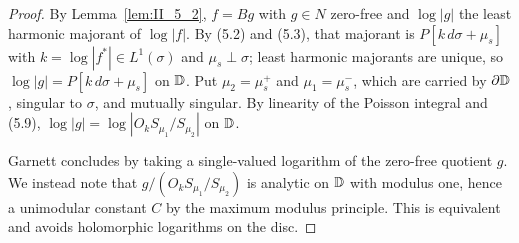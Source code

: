 \begin{proof}
  \leanok
  By Lemma~\ref{lem:II_5_2}, $f=Bg$ with $g\in N$ zero-free and $\log|g|$ the
  least harmonic majorant of $\log|f|$. By (5.2) and (5.3), that majorant is
  $P[k\,d\sigma+\mu_s]$ with $k=\log|f^*|\in L^1(\sigma)$ and
  $\mu_s\perp\sigma$; least harmonic majorants are unique, so
  $\log|g|=P[k\,d\sigma+\mu_s]$ on $\mathbb{D}$. Put $\mu_2=\mu_s^+$ and
  $\mu_1=\mu_s^-$, which are carried by $\partial\mathbb{D}$, singular to $\sigma$,
  and mutually singular. By linearity of the Poisson integral and (5.9),
  $\log|g|=\log|O_k S_{\mu_1}/S_{\mu_2}|$ on $\mathbb{D}$.

  Garnett concludes by taking a single-valued logarithm of the zero-free
  quotient $g$. We instead note that $g/(O_k S_{\mu_1}/S_{\mu_2})$ is analytic
  on $\mathbb{D}$ with modulus one, hence a unimodular constant $C$ by the maximum
  modulus principle. This is equivalent and avoids holomorphic logarithms on
  the disc.
\end{proof}


